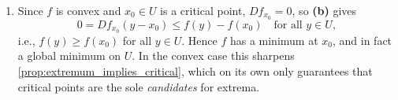 \begin{exercisesolution}
\begin{enumerate}[label=\textbf{(\alph*)}]
    \begin{remark}
    The argument above only ever used differentiability of $f$, never twice-differentiability, so
    the equivalence in \textbf{(b)} already holds for $f \in C^1(U)$ with $U \subseteq
    \mathbb{R}^n$ open and convex, one order of regularity weaker than
    , which is stated for $f \in C^2(U)$. This is exactly
    the fact used in \cref{ex:convexity_properties_multiple_choice}\textbf{(b)}.
    \end{remark}
  \item Since $f$ is convex and $x_0 \in U$ is a critical point, $Df_{x_0} = 0$, so \textbf{(b)}
    gives
    \[0 = Df_{x_0}(y-x_0) \leq f(y)-f(x_0) \quad \text{for all } y \in U,\]
    i.e., $f(y) \geq f(x_0)$ for all $y \in U$. Hence $f$ has a minimum at $x_0$, and in fact a
    global minimum on $U$. In the convex case this sharpens
    \cref{prop:extremum_implies_critical}, which on its own only guarantees that critical points
    are the sole \emph{candidates} for extrema.
\end{enumerate}
\end{exercisesolution}

